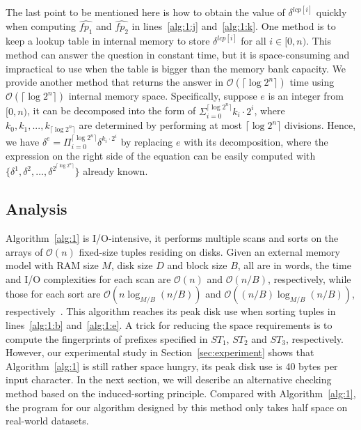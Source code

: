 \documentclass[10pt,journal,compsoc]{IEEEtran}
\begin{document}
The last point to be mentioned here is how to obtain the value of $\delta^{lcp[i]}$ quickly when computing $\hat{fp_1}$ and $\hat{fp_2}$ in lines~\ref{alg:1:j} and~\ref{alg:1:k}. One method is to keep a lookup table in internal memory to store $\delta^{lcp[i]}$ for all $i \in [0, n)$. This method can answer the question in constant time, but it is space-consuming and 
impractical to use when the table is bigger than the memory bank capacity. We provide another method that returns the answer in $\mathcal{O}(\lceil \log2^n \rceil)$ time using $\mathcal{O}(\lceil \log2^n \rceil)$ internal memory space. Specifically, suppose $e$ is an integer from $[0, n)$, it can be decomposed into the form of $\Sigma_{i = 0}^{\lceil \log2^n \rceil}{k_i \cdot 2^i}$, where $k_0, k_1, ..., k_{\lceil \log2^n \rceil}$ are determined by performing at most $\lceil \log2^n \rceil$ divisions. Hence, we have $\delta^e = \Pi_{i = 0}^{\lceil \log2^n \rceil}{\delta}^{k_i \cdot 2^i}$ by replacing $e$ with its decomposition, where the expression on the right side of the equation can be easily computed with $\{{\delta}^{1}, {\delta}^{2}, \dots, {\delta}^{2^{\lceil \log2^n \rceil}} \}$ already known.

\subsection{Analysis} \label{sec:method1:analysis}


Algorithm~\ref{alg:1} is I/O-intensive, it performs multiple scans and sorts on the arrays of $\mathcal{O}(n)$ fixed-size tuples residing on disks. Given an external memory model with RAM size $M$, disk size $D$ and block size $B$, all are in words, the time and I/O complexities for each scan are $\mathcal{O}(n)$ and $\mathcal{O}(n / B)$, respectively, while those for each sort are $\mathcal{O}(n\log_{M/ B}(n / B))$ and $\mathcal{O}((n / B)\log_{M / B}(n / B))$, respectively~\cite{Arge2013}. This algorithm reaches its peak disk use when sorting tuples in lines~\ref{alg:1:b} and~\ref{alg:1:e}. A trick for reducing	the space requirements is to compute the fingerprints of prefixes specified in $ST_1$, $ST_2$ and $ST_3$, respectively. However, our experimental study in Section~\ref{sec:experiment} shows that Algorithm~\ref{alg:1} is still rather space hungry, its peak disk use is 40 bytes per input character. In the next section, we will describe an alternative checking method based on the induced-sorting principle. Compared with Algorithm~\ref{alg:1}, the program for our algorithm designed by this method only takes half space on real-world datasets.
\end{document}
